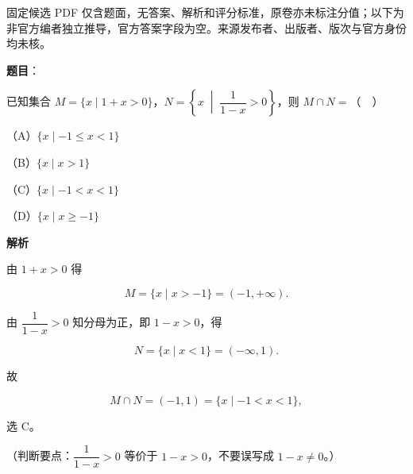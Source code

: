 

\begin{gktip}
固定候选 PDF 仅含题面，无答案、解析和评分标准，原卷亦未标注分值；以下为非官方编者独立推导，官方答案字段为空。来源发布者、出版者、版次与官方身份均未核。
\end{gktip}

\begin{answer}

\textbf{题目}：

已知集合 $M=\{x\mid 1+x>0\}$，$N=\left\{x\;\middle|\;\dfrac{1}{1-x}>0\right\}$，则 $M\cap N=$（　）

（A）$\{x\mid -1\leqslant x<1\}$

（B）$\{x\mid x>1\}$

（C）$\{x\mid -1<x<1\}$

（D）$\{x\mid x\geqslant -1\}$

\textbf{解析}

由 $1+x>0$ 得

\nopagebreak[4]
\[M=\{x\mid x>-1\}=(-1,+\infty).\]

由 $\dfrac{1}{1-x}>0$ 知分母为正，即 $1-x>0$，得

\nopagebreak[4]
\[N=\{x\mid x<1\}=(-\infty,1).\]

故

\nopagebreak[4]
\[M\cap N=(-1,1)=\{x\mid -1<x<1\},\]

选 C。

（判断要点：$\dfrac{1}{1-x}>0$ 等价于 $1-x>0$，不要误写成 $1-x\neq0$。）


\end{answer}
